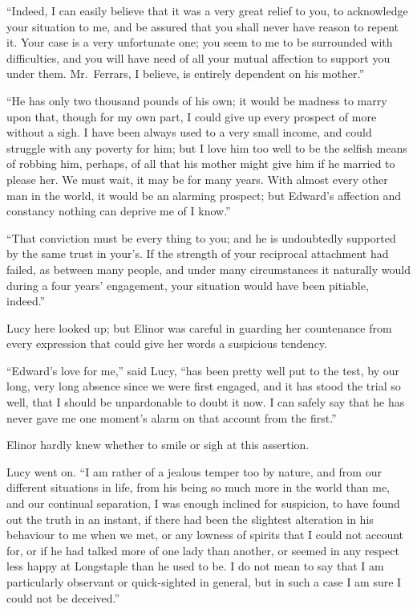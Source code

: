 ``Indeed, I can easily believe that it was a very great
relief to you, to acknowledge your situation to me, and be
assured that you shall never have reason to repent it.
Your case is a very unfortunate one; you seem to me to
be surrounded with difficulties, and you will have need
of all your mutual affection to support you under them.
Mr.\ Ferrars, I believe, is entirely dependent on his mother.''

``He has only two thousand pounds of his own; it would
be madness to marry upon that, though for my own part,
I could give up every prospect of more without a sigh.
I have been always used to a very small income, and could
struggle with any poverty for him; but I love him too well
to be the selfish means of robbing him, perhaps, of all that
his mother might give him if he married to please her.
We must wait, it may be for many years.  With almost every
other man in the world, it would be an alarming prospect;
but Edward's affection and constancy nothing can deprive me of
I know.''

``That conviction must be every thing to you;
and he is undoubtedly supported by the same trust in your's.
If the strength of your reciprocal attachment had failed,
as between many people, and under many circumstances
it naturally would during a four years' engagement,
your situation would have been pitiable, indeed.''

Lucy here looked up; but Elinor was careful
in guarding her countenance from every expression
that could give her words a suspicious tendency.

``Edward's love for me,'' said Lucy, ``has been pretty
well put to the test, by our long, very long absence
since we were first engaged, and it has stood the trial
so well, that I should be unpardonable to doubt it now.
I can safely say that he has never gave me one moment's
alarm on that account from the first.''

Elinor hardly knew whether to smile or sigh
at this assertion.

Lucy went on.  ``I am rather of a jealous temper too
by nature, and from our different situations in life,
from his being so much more in the world than me, and our
continual separation, I was enough inclined for suspicion,
to have found out the truth in an instant, if there had been
the slightest alteration in his behaviour to me when we met,
or any lowness of spirits that I could not account for,
or if he had talked more of one lady than another,
or seemed in any respect less happy at Longstaple than he
used to be.  I do not mean to say that I am particularly
observant or quick-sighted in general, but in such a case
I am sure I could not be deceived.''

